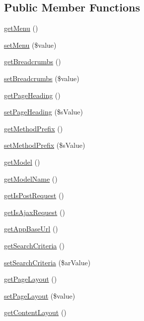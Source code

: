 \subsection*{Public Member Functions}
\begin{DoxyCompactItemize}
\item 
\hyperlink{classCPSController_a637e84e2e9e99a87ea9b5f1771551af4}{getMenu} ()
\item 
\hyperlink{classCPSController_a5cf6c2464263681fdc1186bb94ee9ad8}{setMenu} (\$value)
\item 
\hyperlink{classCPSController_ab53bf1b4b27392839a16ecf3ad62e88b}{getBreadcrumbs} ()
\item 
\hyperlink{classCPSController_a9f9822dfb5d491a6e0b9c836d6ce4e3f}{setBreadcrumbs} (\$value)
\item 
\hyperlink{classCPSController_af6a608839df34306457a0f877695bce0}{getPageHeading} ()
\item 
\hyperlink{classCPSController_ae9f3d82f9cfc2b5c2b2f2387c85e7734}{setPageHeading} (\$sValue)
\item 
\hyperlink{classCPSController_a8a81d9dd6fbd83ceb09f97c07f499e5b}{getMethodPrefix} ()
\item 
\hyperlink{classCPSController_a5c477614d2275918d6498e2c92b41a4f}{setMethodPrefix} (\$sValue)
\item 
\hyperlink{classCPSController_a0a086ca877b41192556a2de7e4a97b98}{getModel} ()
\item 
\hyperlink{classCPSController_a7cd2e13f50fbc61e846e5980f02371f8}{getModelName} ()
\item 
\hyperlink{classCPSController_acea2c7c705d91ba736a41e67314e5ae3}{getIsPostRequest} ()
\item 
\hyperlink{classCPSController_aed1df55c262bb0238ae6ef0921a2552b}{getIsAjaxRequest} ()
\item 
\hyperlink{classCPSController_ae32b7248cefed2da5b054c1a4ab674b1}{getAppBaseUrl} ()
\item 
\hyperlink{classCPSController_ac366c580ea717b34409e76a8ab7a3ab5}{getSearchCriteria} ()
\item 
\hyperlink{classCPSController_a72e3b4ef82df75bc36fda985e7675f6c}{setSearchCriteria} (\$arValue)
\item 
\hyperlink{classCPSController_afd49c7d611aa05c4279a84605f81b771}{getPageLayout} ()
\item 
\hyperlink{classCPSController_a017628084a8217853815f7bbf5715c5f}{setPageLayout} (\$value)
\item 
\hyperlink{classCPSController_a0f302f5db2749bfa4476ac5ec749069c}{getContentLayout} ()

\end{DoxyCompactItemize}
